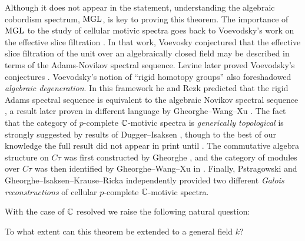 Although it does not appear in the statement, understanding the algebraic cobordism spectrum, $\mathrm{MGL}$, is key to proving this theorem. 
The importance of $\mathrm{MGL}$ to the study of cellular motivic spectra goes back to Voevodsky's work on the effective slice filtration \cite{VoeOpenProbs}.
In that work, Voevosky conjectured that the effective slice filtration of the unit over an algebraically closed field 
may be described in terms of the Adams-Novikov spectral sequence. 
Levine later proved Voevodsky's conjectures \cite{LevineComparison, LevineSlicemU}.
Voevodsky's notion of ``rigid homotopy groups'' also foreshadowed \emph{algebraic degeneration}.
In this framework he and Rezk predicted that the rigid Adams spectral sequence is equivalent to the algebraic Novikov spectral sequence \cite[p. 20-21]{VoeOpenProbs}, a result later proven in different language by Gheorghe--Wang--Xu \cite[Theorem 1.17]{ctauactalol}.
The fact that the category of $p$-complete $\mathbb{C}$-motivic spectra is \emph{generically topological} is strongly suggested by results of Dugger--Isaksen \cite[Section 2.6]{DI}, though to the best of our knowledge the full result did not appear in print until \cite{Pstragowski}.
The commutative algebra structure on $C\tau$ was first constructed by Gheorghe \cite{Ctau},
and the category of modules over $C\tau$ was then identified by Gheorghe--Wang--Xu in \cite{ctauactalol}.
Finally, %
Pstragowski \cite{Pstragowski} and Gheorghe--Isaksen--Krause--Ricka \cite{cmmf}
independently provided two different \emph{Galois reconstructions} of cellular $p$-complete $\mathbb{C}$-motivic spectra. %


With the case of $\mathbb{C}$ resolved we raise the following natural question:

\begin{qst}\label{qst:main}
  To what extent can this theorem be extended to a general field $k$?
\end{qst}


